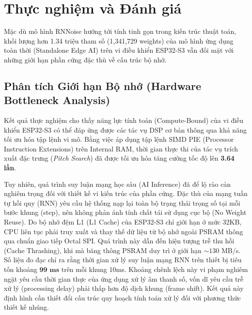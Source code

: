 \section{Thực nghiệm và Đánh giá}
\label{sec:results}

Mặc dù mô hình RNNoise hướng tới tính tinh gọn trong kiến trúc thuật toán, khối lượng hơn 1.34 triệu tham số (1,341,729 weights) của mô hình ứng dụng toàn thời (Standalone Edge AI) trên vi điều khiển ESP32-S3 vẫn đối mặt với những giới hạn phần cứng đặc thù về cấu trúc bộ nhớ.

\subsection{Phân tích Giới hạn Bộ nhớ (Hardware Bottleneck Analysis)}
Kết quả thực nghiệm cho thấy năng lực tính toán (Compute-Bound) của vi điều khiển ESP32-S3 có thể đáp ứng được các tác vụ DSP cơ bản thông qua khả năng tối ưu hóa tập lệnh vi mô. Bằng việc áp dụng tập lệnh SIMD PIE (Processor Instruction Extensions) trên Internal RAM, thời gian thực thi của tác vụ trích xuất đặc trưng (\textit{Pitch Search}) đã được tối ưu hóa tăng cường tốc độ lên \textbf{3.64 lần}.

Tuy nhiên, quá trình suy luận mạng học sâu (AI Inference) đã để lộ rào cản nghiêm trọng đối với thiết kế vi kiến trúc của phần cứng. Đặc thù của mạng tuần tự hồi quy (RNN) yêu cầu hệ thống nạp lại toàn bộ trạng thái trọng số tại mỗi bước khung (step), nên không phản ánh tính chất tái sử dụng cục bộ (No Weight Reuse). Do bộ nhớ đệm L1 (L1 Cache) của ESP32-S3 chỉ giới hạn ở mức 32KB, CPU liên tục phải truy xuất và thay thế dữ liệu từ bộ nhớ ngoài PSRAM thông qua chuẩn giao tiếp Octal SPI. Quá trình này dẫn đến hiện tượng trễ thu hồi (Cache Thrashing), khi mà băng thông PSRAM duy trì ở giới hạn $\sim 130$ MB/s. 
Số liệu đo đạc chỉ ra rằng thời gian xử lý suy luận mạng RNN trên thiết bị tiêu tốn khoảng $\textbf{99 ms}$ trên mỗi khung 10ms. Khoảng chênh lệch này vi phạm nghiêm ngặt yêu cầu thời gian thực của ứng dụng xử lý âm thanh số, vốn dĩ yêu cầu trễ xử lý (processing delay) phải thấp hơn độ dịch khung (frame shift). Kết quả này định hình cần thiết đổi cấu trúc quy hoạch tính toán xử lý đối với phương thức thiết kế nhúng.

